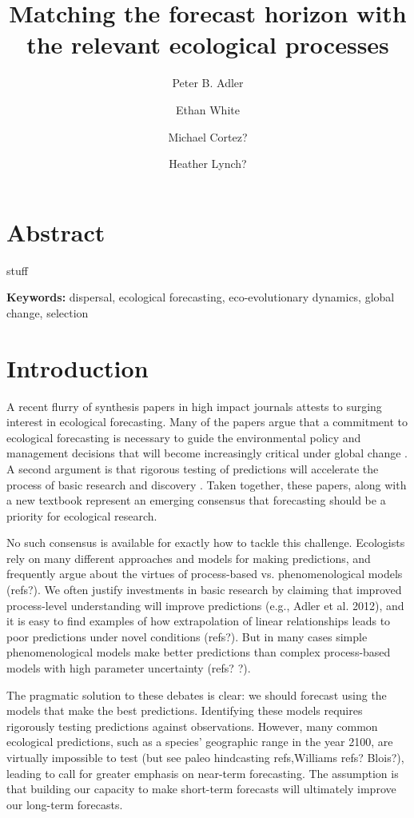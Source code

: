 \documentclass[11pt]{article}
\title{\textbf{ Matching the forecast horizon with the relevant ecological processes }}
\author[1]{Peter B. Adler}  %
\author[2]{Ethan White}
\author[1]{Michael Cortez?}
\author[3]{Heather Lynch?}
\affil[1]{Department of Wildland Resources and the Ecology Center, Utah State University, Logan, Utah}
\affil[2]{some shitty Florida joint}
\begin{document}
\maketitle

\linenumbers

\section*{Abstract}

stuff

\textbf{\large{Keywords:}} dispersal, ecological forecasting, eco-evolutionary dynamics, global change, selection

\section*{Introduction}

A recent flurry of synthesis papers in high impact journals attests to surging interest in ecological forecasting. Many of the papers 
argue that a commitment to ecological forecasting is necessary to guide the environmental policy and management
decisions that will become increasingly critical under global change \citep{clark_ecological_2001,mouquet_review:_2015,dietze_iterative_2018}.
A second argument is that rigorous testing of predictions will accelerate the process of basic research and discovery 
\citep{houlahan_priority_2017,dietze_prediction_2017,dietze_iterative_2018}.
Taken together, these papers, along with a new textbook \citep{dietze_ecological_2017} represent an emerging consensus that 
forecasting should be a priority for ecological research.

No such consensus is available for exactly how to tackle this challenge.
Ecologists rely on many different approaches and models for making predictions, and 
frequently argue about the virtues of process-based vs. phenomenological models (refs?).
We often justify investments in basic research by claiming that improved process-level understanding will improve predictions (e.g., Adler et al. 2012),
and it is easy to find examples of how extrapolation of linear relationships leads to poor predictions under novel conditions (refs?).
But in many cases simple phenomenological models make better predictions than complex process-based models with high parameter
uncertainty (refs? \cite{tredennick_we_2017}?).

The pragmatic solution to these debates is clear: we should forecast using the models that make the best predictions.
Identifying these models requires rigorously testing predictions against observations. However, many common ecological predictions,
such as a species' geographic range in the year 2100, are virtually impossible to test (but see paleo hindcasting refs,Williams refs? Blois?), 
leading \citep{dietze_iterative_2018} to call for greater emphasis on near-term forecasting. The assumption is that building 
our capacity to make short-term forecasts will ultimately improve our long-term forecasts.
\end{document}
